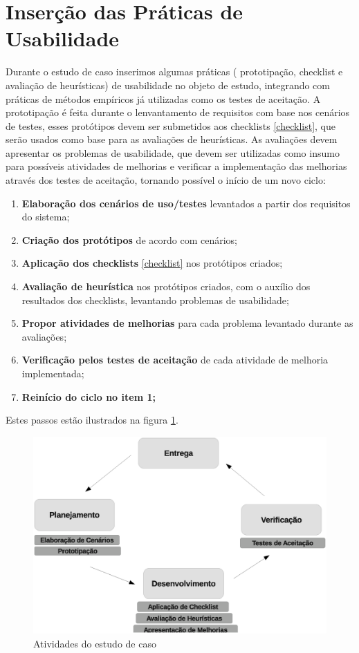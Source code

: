 \section{Inserção das Práticas de Usabilidade}

Durante o estudo de caso inserimos algumas práticas ( prototipação, checklist e avaliação de heurísticas) de usabilidade no objeto de estudo, integrando com práticas de métodos empíricos já utilizadas como os testes de aceitação. A prototipação é feita durante o lenvantamento de requisitos com base nos cenários de testes, esses protótipos devem ser submetidos aos checklists \ref{checklist}, que serão usados como base para as avaliações de heurísticas. As avaliações devem apresentar os problemas de usabilidade, que devem ser utilizadas como insumo para possíveis atividades de melhorias e verificar a implementação das melhorias através dos testes de aceitação, tornando possível o início de um novo ciclo:

\begin{enumerate}
	\item \textbf{Elaboração dos cenários de uso/testes} levantados a partir dos requisitos do sistema;
	\item \textbf{Criação dos protótipos} de acordo com cenários;
	\item \textbf{Aplicação dos checklists} \ref{checklist} nos protótipos criados;
	\item \textbf{Avaliação de heurística} nos protótipos criados, com o auxílio dos resultados dos checklists, levantando problemas de usabilidade;
	\item \textbf{Propor atividades de melhorias} para cada problema levantado durante as avaliações;
	\item \textbf{Verificação pelos testes de aceitação } de cada atividade de melhoria implementada;
	\item \textbf{Reinício do ciclo no item 1;} 
\end{enumerate}

Estes passos estão ilustrados na figura \ref{diagrama1}.

\begin{figure}[h!]
    	\centering
    	\includegraphics[keepaspectratio=true,scale=0.35]
      		{figuras/diagrama.eps}
    	\caption{Atividades do estudo de caso}
    	\label{diagrama1}
\end{figure}

